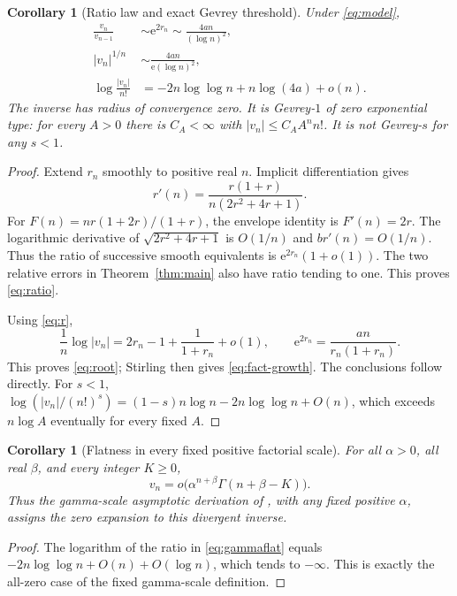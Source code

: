 \documentclass[11pt,a4paper]{article}
\numberwithin{equation}{section}
\newtheorem{corollary}[theorem]{Corollary}
\theoremstyle{definition}
\theoremstyle{remark}\newtheorem{remark}[theorem]{Remark}
\newcommand{\ee}{\mathrm e}\newcommand{\dd}{\mathrm d}
\begin{document}
\begin{corollary}[Ratio law and exact Gevrey threshold]
\label{cor:gevrey}
Under \eqref{eq:model},
\begin{align}
 \frac{v_n}{v_{n-1}}&\sim\ee^{2r_n}
 \sim\frac{4an}{(\log n)^2},\label{eq:ratio}\\
 |v_n|^{1/n}&\sim\frac{4an}{\ee(\log n)^2},\label{eq:root}\\
 \log\frac{|v_n|}{n!}
 &=-2n\log\log n+n\log(4a)+o(n).\label{eq:fact-growth}
\end{align}
The inverse has radius of convergence zero. It is Gevrey-$1$ of zero
exponential type: for every $A>0$ there is $C_A<\infty$ with
$|v_n|\le C_AA^nn!$. It is not Gevrey-$s$ for any $s<1$.
\end{corollary}
\begin{proof}
Extend $r_n$ smoothly to positive real $n$. Implicit differentiation gives
\begin{equation}
 r'(n)=\frac{r(1+r)}{n(2r^2+4r+1)}.
 \label{eq:rprime}
\end{equation}
For $F(n)=nr(1+2r)/(1+r)$, the envelope identity is $F'(n)=2r$.
The logarithmic derivative of $\sqrt{2r^2+4r+1}$ is $O(1/n)$ and
$br'(n)=O(1/n)$. Thus the ratio of successive smooth equivalents is
$\ee^{2r_n}(1+o(1))$. The two relative errors in Theorem~\ref{thm:main}
also have ratio tending to one. This proves \eqref{eq:ratio}.

Using \eqref{eq:r},
\[
 \frac1n\log|v_n|=2r_n-1+\frac1{1+r_n}+o(1),\qquad
 \ee^{2r_n}=\frac{an}{r_n(1+r_n)}.
\]
This proves \eqref{eq:root}; Stirling then gives \eqref{eq:fact-growth}.
The conclusions follow directly. For $s<1$,
$\log(|v_n|/(n!)^s)=(1-s)n\log n-2n\log\log n+O(n)$,
which exceeds $n\log A$ eventually for every fixed $A$.
\end{proof}

\begin{corollary}[Flatness in every fixed positive factorial scale]
For all $\alpha>0$, all real $\beta$, and every integer $K\ge0$,
\begin{equation}
 v_n=o\bigl(\alpha^{n+\beta}\Gamma(n+\beta-K)\bigr).
 \label{eq:gammaflat}
\end{equation}
Thus the gamma-scale asymptotic derivation of \cite{borinsky}, with any
fixed positive $\alpha$, assigns the zero expansion to this divergent inverse.
\end{corollary}
\begin{proof}
The logarithm of the ratio in \eqref{eq:gammaflat} equals
$-2n\log\log n+O(n)+O(\log n)$, which tends to $-\infty$.
This is exactly the all-zero case of the fixed gamma-scale definition.
\end{proof}
\end{document}

